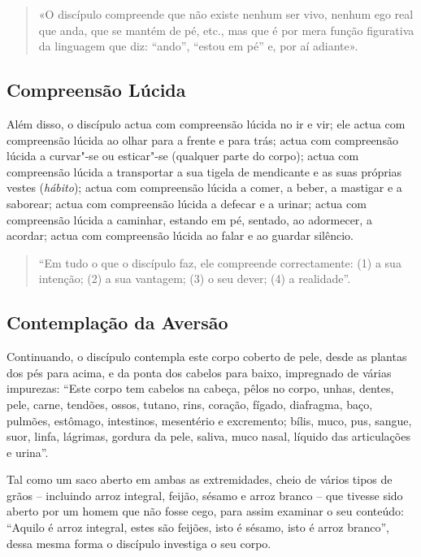 \begin{quote}
  «O discípulo compreende que não existe nenhum ser vivo, nenhum ego real que
  anda, que se mantém de pé, etc., mas que é por mera função figurativa da
  linguagem que diz: “ando”, “estou em pé” e, por aí adiante».
\end{quote}

\subsection{Compreensão Lúcida}


Além disso, o discípulo actua com compreensão lúcida no ir e vir; ele actua com
compreensão lúcida ao olhar para a frente e para trás; actua com compreensão
lúcida a curvar"-se ou esticar"-se (qualquer parte do corpo); actua com
compreensão lúcida a transportar a sua tigela de mendicante e as suas próprias
vestes (\emph{hábito}); actua com compreensão lúcida a comer, a beber, a
mastigar e a saborear; actua com compreensão lúcida a defecar e a urinar; actua
com compreensão lúcida a caminhar, estando em pé, sentado, ao adormecer, a
acordar; actua com compreensão lúcida ao falar e ao guardar silêncio.


\enlargethispage{\baselineskip}

\begin{quote}
  “Em tudo o que o discípulo faz, ele compreende correctamente: (1) a sua
  intenção; (2) a sua vantagem; (3) o seu dever; (4) a realidade”.
\end{quote}

\subsection{Contemplação da Aversão}


Continuando, o discípulo contempla este corpo coberto de pele, desde as plantas
dos pés para acima, e da ponta dos cabelos para baixo, impregnado de várias
impurezas: “Este corpo tem cabelos na cabeça, pêlos no corpo, unhas, dentes,
pele, carne, tendões, ossos, tutano, rins, coração, fígado, diafragma, baço,
pulmões, estômago, intestinos, mesentério e excremento; bílis, muco, pus,
sangue, suor, linfa, lágrimas, gordura da pele, saliva, muco nasal, líquido das
articulações e urina”.

Tal como um saco aberto em ambas as extremidades, cheio de vários tipos de grãos
-- incluindo arroz integral, feijão, sésamo e arroz branco -- que tivesse sido
aberto por um homem que não fosse cego, para assim examinar o seu conteúdo:
“Aquilo é arroz integral, estes são feijões, isto é sésamo, isto é arroz
branco”, dessa mesma forma o discípulo investiga o seu corpo.

